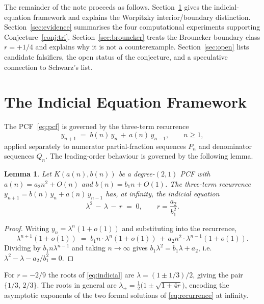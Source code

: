 \documentclass[11pt]{amsart}
\newtheorem{lemma}[theorem]{Lemma}
\theoremstyle{definition}
\theoremstyle{remark}
\begin{document}
The remainder of the note proceeds as follows.
Section~\ref{sec:framework} gives the indicial-equation framework
and explains the Worpitzky interior/boundary distinction.
Section~\ref{sec:evidence} summarises the four computational
experiments supporting Conjecture~\ref{conj:tri}.
Section~\ref{sec:brouncker} treats the Brouncker boundary class
$r = +1/4$ and explains why it is not a counterexample.
Section~\ref{sec:open} lists candidate falsifiers, the open status
of the conjecture, and a speculative connection to Schwarz's list.

\section{The Indicial Equation Framework}\label{sec:framework}

The PCF~\eqref{eq:pcf} is governed by the three-term recurrence
\begin{equation}\label{eq:recurrence}
  y_{n+1} \;=\; b(n)\, y_n \,+\, a(n)\, y_{n-1},
  \qquad n \ge 1,
\end{equation}
applied separately to numerator partial-fraction sequences
$P_n$ and denominator sequences $Q_n$.  The leading-order behaviour
is governed by the following lemma.

\begin{lemma}\label{lem:indicial}
Let $K(a(n),b(n))$ be a degree-$(2,1)$ PCF with $a(n) =
a_2 n^2 + O(n)$ and $b(n) = b_1 n + O(1)$.  The three-term
recurrence $y_{n+1} = b(n)\, y_n + a(n)\, y_{n-1}$ has, at
infinity, the \emph{indicial equation}
\begin{equation}\label{eq:indicial}
  \lambda^2 \,-\, \lambda \,-\, r \;=\; 0,
  \qquad r = \frac{a_2}{b_1^2}.
\end{equation}
\end{lemma}
\begin{proof}
Writing $y_n = \lambda^n (1 + o(1))$ and substituting into the
recurrence,
\[
  \lambda^{n+1}(1+o(1)) \;=\; b_1 n \cdot \lambda^n(1+o(1))
  \,+\, a_2 n^2 \cdot \lambda^{n-1}(1+o(1)).
\]
Dividing by $b_1 n \lambda^{n-1}$ and taking $n\to\infty$ gives
$b_1 \lambda^2 = b_1 \lambda + a_2$, i.e.\ $\lambda^2 - \lambda -
a_2/b_1^2 = 0$.
\end{proof}

For $r = -2/9$ the roots of \eqref{eq:indicial} are
$\lambda = (1 \pm 1/3)/2$, giving the pair $\{1/3,\, 2/3\}$.
The roots in general are
$\lambda_\pm = \tfrac{1}{2}\bigl(1 \pm \sqrt{1 + 4r}\bigr)$,
encoding the asymptotic exponents of the two formal solutions of
\eqref{eq:recurrence} at infinity.
\end{document}
